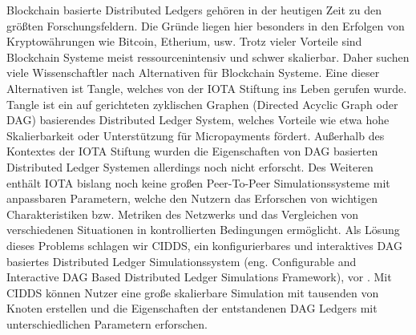 Blockchain basierte Distributed Ledgers gehören in der heutigen Zeit zu den größten Forschungsfeldern. Die Gründe liegen hier besonders in den Erfolgen von Kryptowährungen wie Bitcoin, Etherium, usw. Trotz vieler Vorteile sind Blockchain Systeme meist ressourcenintensiv und schwer skalierbar. Daher suchen viele Wissenschaftler nach Alternativen für Blockchain Systeme. Eine dieser Alternativen ist Tangle, welches von der IOTA Stiftung ins Leben gerufen wurde. Tangle ist ein auf gerichteten zyklischen Graphen (Directed Acyclic Graph oder DAG) basierendes Distributed Ledger System, welches Vorteile wie etwa hohe Skalierbarkeit oder Unterstützung für Micropayments fördert. Außerhalb des Kontextes der IOTA Stiftung wurden die Eigenschaften von DAG basierten Distributed Ledger Systemen allerdings noch nicht erforscht. Des Weiteren enthält IOTA bislang noch keine großen Peer-To-Peer Simulationssysteme mit anpassbaren Parametern, welche den Nutzern das Erforschen von wichtigen Charakteristiken bzw. Metriken des Netzwerks und das Vergleichen von verschiedenen Situationen in kontrollierten Bedingungen ermöglicht. Als Lösung dieses Problems schlagen wir CIDDS, ein konfigurierbares und interaktives DAG basiertes Distributed Ledger Simulationssystem (eng. Configurable and Interactive DAG Based Distributed Ledger Simulations Framework), vor . Mit CIDDS können Nutzer eine große skalierbare Simulation mit tausenden von Knoten erstellen und die Eigenschaften der entstandenen DAG Ledgers mit unterschiedlichen Parametern erforschen.